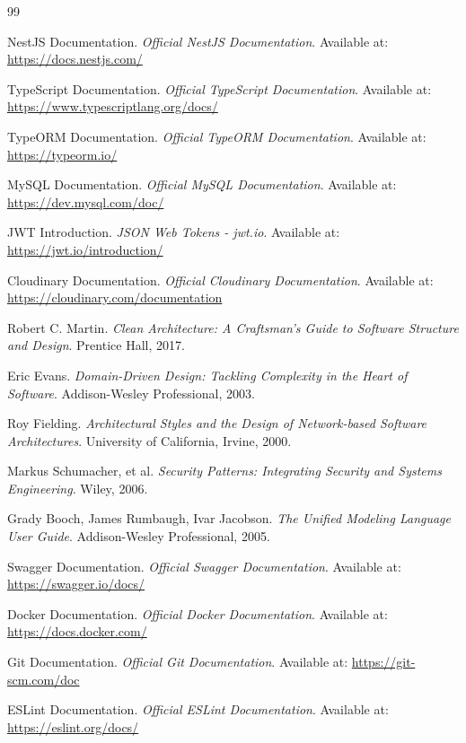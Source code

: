 \begin{thebibliography}{99}

NestJS Documentation. 
\emph{Official NestJS Documentation}. 
Available at: \url{https://docs.nestjs.com/}

TypeScript Documentation. 
\emph{Official TypeScript Documentation}. 
Available at: \url{https://www.typescriptlang.org/docs/}

TypeORM Documentation. 
\emph{Official TypeORM Documentation}. 
Available at: \url{https://typeorm.io/}

MySQL Documentation. 
\emph{Official MySQL Documentation}. 
Available at: \url{https://dev.mysql.com/doc/}

JWT Introduction. 
\emph{JSON Web Tokens - jwt.io}. 
Available at: \url{https://jwt.io/introduction/}

Cloudinary Documentation. 
\emph{Official Cloudinary Documentation}. 
Available at: \url{https://cloudinary.com/documentation}

Robert C. Martin. 
\emph{Clean Architecture: A Craftsman's Guide to Software Structure and Design}. 
Prentice Hall, 2017.

Eric Evans. 
\emph{Domain-Driven Design: Tackling Complexity in the Heart of Software}. 
Addison-Wesley Professional, 2003.

Roy Fielding. 
\emph{Architectural Styles and the Design of Network-based Software Architectures}. 
University of California, Irvine, 2000.

Markus Schumacher, et al. 
\emph{Security Patterns: Integrating Security and Systems Engineering}. 
Wiley, 2006.

Grady Booch, James Rumbaugh, Ivar Jacobson. 
\emph{The Unified Modeling Language User Guide}. 
Addison-Wesley Professional, 2005.

Swagger Documentation. 
\emph{Official Swagger Documentation}. 
Available at: \url{https://swagger.io/docs/}

Docker Documentation. 
\emph{Official Docker Documentation}. 
Available at: \url{https://docs.docker.com/}

Git Documentation. 
\emph{Official Git Documentation}. 
Available at: \url{https://git-scm.com/doc}

ESLint Documentation. 
\emph{Official ESLint Documentation}. 
Available at: \url{https://eslint.org/docs/}


\end{thebibliography}
